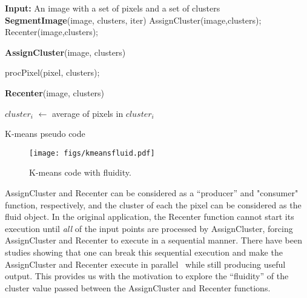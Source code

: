\begin{algorithm}
\scriptsize

\begin{algorithmic}
\STATE \textbf{Input: } An image with a set of pixels and a set of clusters
\STATE \textbf{SegmentImage}(image, clusters, iter)
	\STATE AssignCluster(image,clusters);
    \STATE Recenter(image,clusters);
\ENDFOR

\STATE \textbf{AssignCluster}(image, clusters)
 
  \STATE procPixel(pixel, clusters);
 \ENDFOR
 
\STATE \textbf{Recenter}(image, clusters)
 
     \STATE $cluster_i$ $\gets$ average of pixels in $cluster_i$
 \ENDFOR
\end{algorithmic}
\caption{K-means pseudo code}
\label{alg:kmeans}
\end{algorithm}

\begin{figure}
\vspace{-0pt}
\centering
\texttt{[image: figs/kmeansfluid.pdf]}
\vspace{-12pt}\caption{K-means code with fluidity.}\label{figs:kmeansfluid}\vspace{-12pt}
\end{figure}

AssignCluster and Recenter can be considered as a ``producer'' and "consumer" function, respectively, and the cluster of each the pixel can be considered as the fluid object. In the original application, the Recenter function cannot start its execution until {\it all} of the input points are processed by AssignCluster, forcing AssignCluster and Recenter to execute in a sequential manner. There have been studies showing that one can break this sequential execution and make the AssignCluster and Recenter execute in parallel~\cite{orhan} while still producing useful output. This provides us with the motivation to explore the ``fluidity'' of the cluster value passed between the AssignCluster and Recenter functions.

